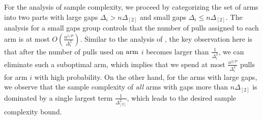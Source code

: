 	
	For the analysis of sample complexity,
	we proceed by categorizing the set of arms into two parts with large gaps \(\Delta_i > n \Delta_{[2]}\) and small gaps \(\Delta_i \le n\Delta_{[2]}\). 
	The analysis for a small gaps group controls that the number of pulls assigned to each arm is at most \(O(\frac{n^{1/P}}{\Delta_i^2})\). Similar to the analysis of \cite{KarninKS13,JinH0X21}, the key observation here is that after the number of pulls used on $\textnormal{arm}$ $i$ becomes larger than \(\frac{1}{\Delta^2_i}\), we can eliminate such a suboptimal arm, %
	which implies that we spend at most \(\frac{n^{2/P}}{\Delta^2_i}\) pulls for arm \(i\) with high probability. 
	On the other hand, for the arms with large gaps, we observe that the sample complexity of \emph{all} arms with gaps more than $n\Delta_{[2]}$ is dominated by a single largest term \(\frac{1}{\Delta^2_{[2]}}\), which leads to the desired sample complexity bound.



